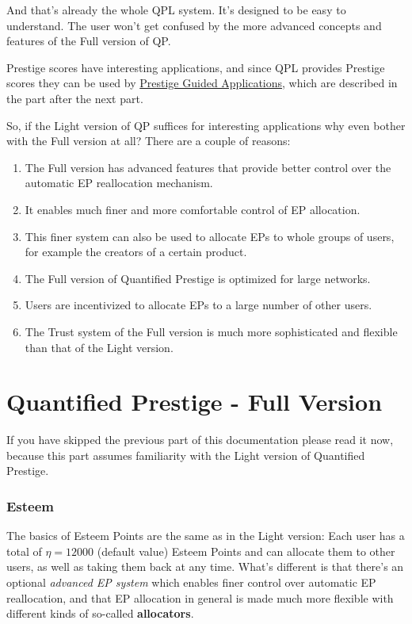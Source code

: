 \documentclass[a4paper,12pt]{scrartcl}
\newcounter{example}
\newcounter{rationale}
\newcounter{comment}
\begin{document}
And that's already the whole QPL system. It's designed to be easy to understand. The user won't get confused by the more advanced concepts and features of the Full version of QP.

Prestige scores have interesting applications, and since QPL provides Prestige scores they can be used by \hyperref[PGAs]{Prestige Guided Applications}, which are described in the part after the next part.

\begin{mdframed}[style=rationale, comment=Why the Full Version of QP is Awesome]
So, if the Light version of QP suffices for interesting applications why even bother with the Full version at all? There are a couple of reasons:
\begin{enumerate}
 \item The Full version has advanced features that provide better control over the automatic EP reallocation mechanism.
 \item It enables much finer and more comfortable control of EP allocation.
 \item This finer system can also be used to allocate EPs to whole groups of users, for example the creators of a certain product.
 \item The Full version of Quantified Prestige is optimized for large networks.
 \item Users are incentivized to allocate EPs to a large number of other users.
 \item The Trust system of the Full version is much more sophisticated and flexible than that of the Light version.
\end{enumerate}
\end{mdframed}


\part{Quantified Prestige - Full Version}
If you have skipped the previous part of this documentation please read it now, because this part assumes familiarity with the Light version of Quantified Prestige.

\section{Esteem}
The basics of Esteem Points are the same as in the Light version: Each user has a total of $\eta = 12000$ (default value) Esteem Points and can allocate them to other users, as well as taking them back at any time. What's different is that there's an optional \textit{advanced EP system} which enables finer control over automatic EP reallocation, and that EP allocation in general is made much more flexible with different kinds of so-called \textbf{allocators}.
\end{document}
